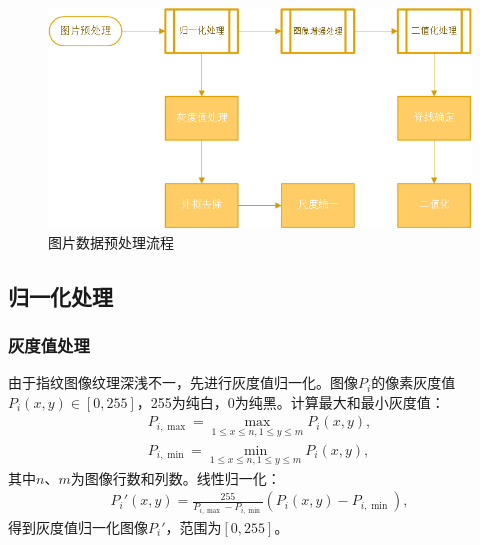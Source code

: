 \documentclass{whutmod}
\begin{document}
        \begin{figure}[H]
            \centering
            \includegraphics[width=.9\textwidth]{figures/chou4.png}
            \caption{图片数据预处理流程}\label{dfsg}
        \end{figure}

        \subsection{归一化处理}
            \subsubsection{灰度值处理}
                由于指纹图像纹理深浅不一，先进行灰度值归一化。图像$P_i$的像素灰度值$P_i(x,y) \in [0,255]$，255为纯白，0为纯黑。计算最大和最小灰度值：
                \begin{gather*}
                    P_{i,\max} = \max_{1 \leqslant x \leqslant n, 1 \leqslant y \leqslant m} P_i(x,y), \\
                    P_{i,\min} = \min_{1 \leqslant x \leqslant n, 1 \leqslant y \leqslant m} P_i(x,y),
                \end{gather*}
                其中$n$、$m$为图像行数和列数。线性归一化：
                \begin{gather*}
                    P_i'(x,y) = \frac{255}{P_{i,\max} - P_{i,\min}} (P_i(x,y) - P_{i,\min}),
                \end{gather*}
                得到灰度值归一化图像$P_i'$，范围为$[0,255]$。
\end{document}
